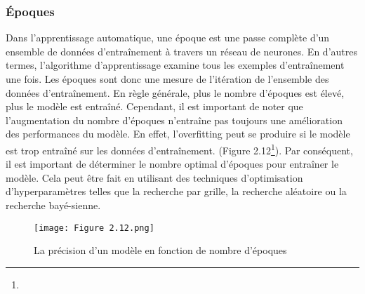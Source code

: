 \subsubsection{Époques}
Dans l'apprentissage automatique, une époque est une passe complète d'un ensemble de données d'entraînement à travers un réseau de neurones. En d'autres termes, l'algorithme d'apprentissage examine tous les exemples d'entraînement une fois. Les époques sont donc une mesure de l'itération de l'ensemble des données d'entraînement. En règle générale, plus le nombre d’époques est élevé, plus le modèle est entraîné. Cependant, il est important de noter que l'augmentation du nombre d’époques n'entraîne pas toujours une amélioration des performances du modèle. En effet, l'overfitting peut se produire si le modèle est trop entraîné sur les données d'entraînement. (Figure 2.12\footnote{}). Par conséquent, il est important de déterminer le nombre optimal d’époques pour entraîner le modèle. Cela peut être fait en utilisant des techniques d'optimisation d'hyperparamètres telles que la recherche par grille, la recherche aléatoire ou la recherche bayé-sienne.
\clearpage
\begin{figure}[!h]
  \centering
  \texttt{[image: Figure 2.12.png]}
  \caption{La précision d’un modèle en fonction de nombre d’époques}
  \label{fig:Epoque}
\end{figure}

\vspace{1cm}

